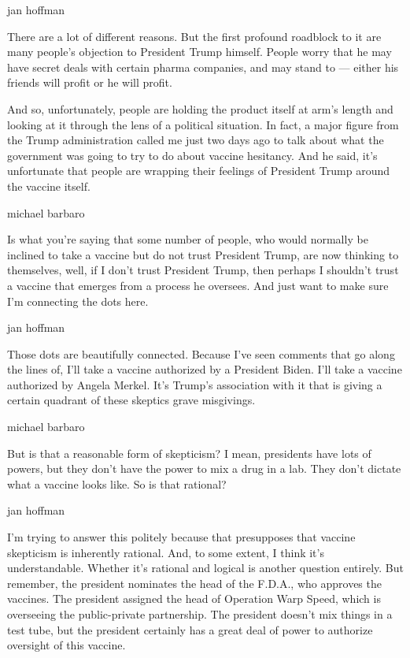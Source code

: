 jan hoffman

There are a lot of different reasons. But the first profound roadblock
to it are many people's objection to President Trump himself. People
worry that he may have secret deals with certain pharma companies, and
may stand to --- either his friends will profit or he will profit.

And so, unfortunately, people are holding the product itself at arm's
length and looking at it through the lens of a political situation. In
fact, a major figure from the Trump administration called me just two
days ago to talk about what the government was going to try to do about
vaccine hesitancy. And he said, it's unfortunate that people are
wrapping their feelings of President Trump around the vaccine itself.

michael barbaro

Is what you're saying that some number of people, who would normally be
inclined to take a vaccine but do not trust President Trump, are now
thinking to themselves, well, if I don't trust President Trump, then
perhaps I shouldn't trust a vaccine that emerges from a process he
oversees. And just want to make sure I'm connecting the dots here.

jan hoffman

Those dots are beautifully connected. Because I've seen comments that go
along the lines of, I'll take a vaccine authorized by a President Biden.
I'll take a vaccine authorized by Angela Merkel. It's Trump's
association with it that is giving a certain quadrant of these skeptics
grave misgivings.

michael barbaro

But is that a reasonable form of skepticism? I mean, presidents have
lots of powers, but they don't have the power to mix a drug in a lab.
They don't dictate what a vaccine looks like. So is that rational?

jan hoffman

I'm trying to answer this politely because that presupposes that vaccine
skepticism is inherently rational. And, to some extent, I think it's
understandable. Whether it's rational and logical is another question
entirely. But remember, the president nominates the head of the F.D.A.,
who approves the vaccines. The president assigned the head of Operation
Warp Speed, which is overseeing the public-private partnership. The
president doesn't mix things in a test tube, but the president certainly
has a great deal of power to authorize oversight of this vaccine.

